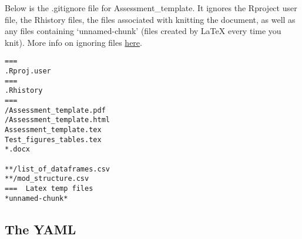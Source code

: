 \documentclass[12pt,]{article}
\begin{document}
Below is the .gitignore file for Assessment\_template. It ignores the
Rproject user file, the Rhistory files, the files associated with
knitting the document, as well as any files containing `unnamed-chunk'
(files created by LaTeX every time you knit). More info on ignoring
files \href{http://git-scm.com/docs/gitignore}{here}.

\begin{Verbatim}[frame=single]
===  
.Rproj.user 
===   
.Rhistory  
===   
/Assessment_template.pdf
/Assessment_template.html
Assessment_template.tex
Test_figures_tables.tex
*.docx

**/list_of_dataframes.csv
**/mod_structure.csv
===  Latex temp files  
*unnamed-chunk*
\end{Verbatim}

\newpage

\subsection{The YAML}\label{the-yaml}
\end{document}
